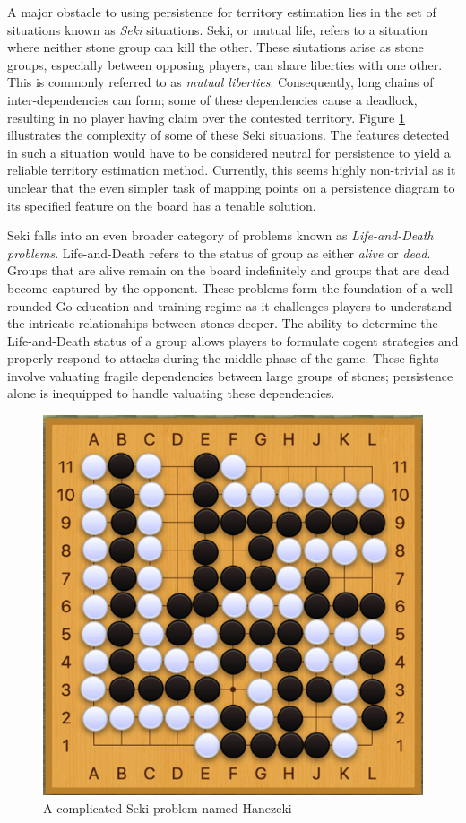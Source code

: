 \documentclass[11pt]{article}
\begin{document}
A major obstacle to using persistence for territory estimation lies in the set of situations known as \textit{Seki} situations. Seki, or mutual life, refers to a situation where neither stone group can kill the other. These siutations arise as stone groups, especially between opposing players, can share liberties with one other. This is commonly referred to as \textit{mutual liberties}. Consequently, long chains of inter-dependencies can form; some of these dependencies cause a deadlock, resulting in no player having claim over the contested territory. Figure \ref{fig:seki1} illustrates the complexity of some of these Seki situations. The features detected in such a situation would have to be considered neutral for persistence to yield a reliable territory estimation method. Currently, this seems highly non-trivial as it unclear that the even simpler task of mapping points on a persistence diagram to its specified feature on the board has a tenable solution.

Seki falls into an even broader category of problems known as \textit{Life-and-Death problems}. Life-and-Death refers to the status of group as either \textit{alive} or \textit{dead}. Groups that are alive remain on the board indefinitely and groups that are dead become captured by the opponent. These problems form the foundation of a well-rounded Go education and training regime as it challenges players to understand the intricate relationships between stones deeper. The ability to determine the Life-and-Death status of a group allows players to formulate cogent strategies and properly respond to attacks during the middle phase of the game. These fights involve valuating fragile dependencies between large groups of stones; persistence alone is inequipped to handle valuating these dependencies.

\begin{figure}[ht]
  \centering
  \includegraphics[scale=0.6]{seki1.png}
  \caption{A complicated Seki problem named Hanezeki}
  \label{fig:seki1}
\end{figure}
\end{document}
